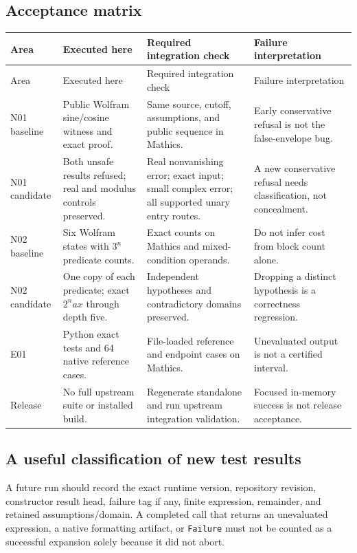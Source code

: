 \documentclass[11pt,a4paper]{article}
\begin{document}
\subsection{Acceptance matrix}
\begin{longtable}{@{}P{20mm}P{41mm}P{44mm}P{42mm}@{}}
\toprule
Area & Executed here & Required integration check & Failure interpretation\\
\midrule
\endfirsthead
\toprule Area & Executed here & Required integration check & Failure interpretation\\\midrule
\endhead
N01 baseline & Public Wolfram sine/cosine witness and exact proof. & Same source, cutoff, assumptions, and public sequence in Mathics. & Early conservative refusal is not the false-envelope bug.\\[4pt]
N01 candidate & Both unsafe results refused; real and modulus controls preserved. & Real nonvanishing error; exact input; small complex error; all supported unary entry routes. & A new conservative refusal needs classification, not concealment.\\[4pt]
N02 baseline & Six Wolfram states with $3^n$ predicate counts. & Exact counts on Mathics and mixed-condition operands. & Do not infer cost from block count alone.\\[4pt]
N02 candidate & One copy of each predicate; exact $2^n a x$ through depth five. & Independent hypotheses and contradictory domains preserved. & Dropping a distinct hypothesis is a correctness regression.\\[4pt]
E01 & Python exact tests and 64 native reference cases. & File-loaded reference and endpoint cases on Mathics. & Unevaluated output is not a certified interval.\\[4pt]
Release & No full upstream suite or installed build. & Regenerate standalone and run upstream integration validation. & Focused in-memory success is not release acceptance.\\
\bottomrule
\end{longtable}

\subsection{A useful classification of new test results}
A future run should record the exact runtime version, repository revision, constructor result head, failure tag if any, finite expression, remainder, and retained assumptions/domain. A completed call that returns an unevaluated expression, a native formatting artifact, or \texttt{Failure} must not be counted as a successful expansion solely because it did not abort.
\end{document}

